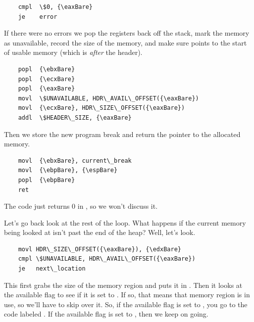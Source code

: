 \begin{simpletyping}
\begin{lstlisting}
	cmpl  \$0, {\eaxBare}
	je    error
\end{lstlisting}
\end{simpletyping}

If there were no errors we pop the registers back off the stack, mark the memory as 
unavailable, record the size of the memory, and make sure {\eaxReg} points to the start of usable
memory (which is \emph{after} the header).

\begin{simpletyping}
\begin{lstlisting}
	popl  {\ebxBare}
	popl  {\ecxBare}
	popl  {\eaxBare}
	movl  \$UNAVAILABLE, HDR\_AVAIL\_OFFSET({\eaxBare})
	movl  {\ecxBare}, HDR\_SIZE\_OFFSET({\eaxBare})
	addl  \$HEADER\_SIZE, {\eaxBare}
\end{lstlisting}
\end{simpletyping}

Then we store the new program break and return the pointer to the allocated memory.

\begin{simpletyping}
\begin{lstlisting}
	movl  {\ebxBare}, current\_break
	movl  {\ebpBare}, {\espBare}
	popl  {\ebpBare}
	ret
\end{lstlisting}
\end{simpletyping}

The  code just returns 0 in {\eaxReg}, so we won't 
discuss it.

Let's go back look at the rest of the loop.  What happens if the current memory being 
looked at isn't past the end of the heap?  Well, let's look.

\begin{simpletyping}
\begin{lstlisting}
	movl HDR\_SIZE\_OFFSET({\eaxBare}), {\edxBare}
	cmpl \$UNAVAILABLE, HDR\_AVAIL\_OFFSET({\eaxBare})
	je   next\_location
\end{lstlisting}
\end{simpletyping}

This first grabs the size of the memory region and puts it in {\edxReg}.
Then it looks at the available flag to see if it is set to .
If so, that means that memory region is in use, so we'll have to skip over it.  So, if
the available flag is set to , you go to the code
labeled .  If the available flag is set to
, then we keep on going.  

